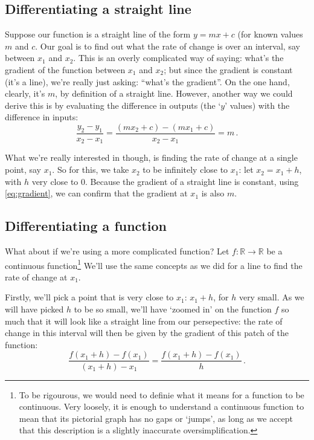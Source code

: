 \documentclass[12pt]{article}
\begin{document}
\subsection*{Differentiating a straight line}
Suppose our function is a straight line of the form $y=mx+c$ (for known values $m$ and $c$. Our goal is to find out what the rate of change is over an interval, say between $x_1$ and $x_2$. This is an overly complicated way of saying: what's the gradient of the function between $x_1$ and $x_2$; but since the gradient is constant (it's a line), we're really just asking: ``what's the gradient''. On the one hand, clearly, it's $m$, by definition of a straight line. However, another way we could derive this is by evaluating the difference in outputs (the `$y$' values) with the difference in inputs:
\begin{equation}\label{eq:gradient}
\frac{y_2 - y_1}{x_2 - x_1} = \frac{(m x_2 +c ) - (m x_1 + c)}{x_2 - x_1} = m\,.
\end{equation}

What we're really interested in though, is finding the rate of change at a single point, say $x_1$. So for this, we take $x_2$ to be infinitely close to $x_1$: let $x_2 = x_1 + h$, with $h$ very close to $0$. Because the gradient of a straight line is constant, using \eqref{eq:gradient}, we can confirm that the gradient at $x_1$ is also $m$.

\subsection*{Differentiating a function}
What about if we're using a more complicated function? Let $f:\mathbb{R}\rightarrow \mathbb{R}$ be a continuous function\footnote{To be rigourous, we would need to definie what it means for a function to be continuous. Very loosely, it is enough to understand a continuous function to mean that its pictorial graph has no gaps or `jumps', as long as we accept that this description is a slightly inaccurate oversimplification.} We'll use the same concepts as we did for a line to find the rate of change at $x_1$.

Firstly, we'll pick a point that is very close to $x_1$: $x_1 + h$, for $h$ very small. As we will have picked $h$ to be so small, we'll have `zoomed in' on the function $f$ so much that it will look like a straight line from our persepective: the rate of change in this interval will then be given by the gradient of this patch of the function:
\begin{equation*}\label{eq:derivative}
\frac{f(x_1+h) - f(x_1)}{(x_1+h)- x_1} 
=\frac{f(x_1+h) - f(x_1)}{h}\,.    
\end{equation*} 
\end{document}
